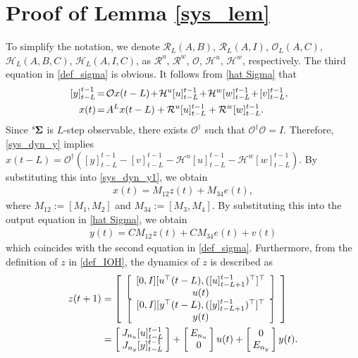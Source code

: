 \documentclass[preprint,5p,times,twocolumn]{elsarticle}
\newcommand{\bm}[1]{{\mbox{\boldmath $#1$}}}
\def\rms{{}^{\rm s}\hspace{-0.2mm}}
\def\h{\hspace{-0.5mm}}
\def\H{\hspace{-1.0mm}}
\def\HH{\hspace{-2.0mm}}
\begin{document}
\section{Proof of Lemma \ref{sys_lem}}\label{prf_sys_lem}
To simplify the notation, we denote 
$\mathcal R_L(A,B)$, 
$\mathcal R_L(A,I)$, 
$\mathcal O_L(A,C)$, 
$\mathcal H_L(A,B,C)$, 
$\mathcal H_L(A,I,C)$, as
$\mathcal R^u$, 
$\mathcal R^w$, 
$\mathcal O$,
$\mathcal H^u$, 
$\mathcal H^w$, respectively. The third equation in \eqref{def_sigma} is obvious. It follows from \eqref{hat Sigma} that
\begin{align}
\HH \H {[y]}_{t-L}^{t-1} & \h =\h \mathcal Ox(t-L) \h+\h \mathcal H^u[u]_{t-L}^{t-1}\h+\h \mathcal H^w[w]_{t-L}^{t-1} \h+\h [v]_{t-L}^{t-1},   \label{sys_dyn_y} \\
\HH \H x(t) & \h =\h A^Lx(t-L) + \mathcal R^u[u]_{t-L}^{t-1} + \mathcal R^w[w]_{t-L}^{t-1}.  \label{sys_dyn_y1}
\end{align}
Since $\rms {\bm \Sigma}$ is $L$-step observable, there exists $\mathcal O^{\dagger}$ such that $\mathcal O^{\dagger}\mathcal O = I$. Therefore, \eqref{sys_dyn_y} implies $x(t-L) = {\mathcal O}^{\dagger}\left({[y]}_{t-L}^{t-1} - [v]_{t-L}^{t-1} - \mathcal H^u[u]_{t-L}^{t-1} - \mathcal H^w[w]_{t-L}^{t-1}\right)$. By substituting this into \eqref{sys_dyn_y1}, we obtain  
\begin{align}
  x(t) = M_{12} z(t) + M_{34} e(t),  \label{x_IOH_rep}
\end{align}
where $M_{12} := [M_1, M_2]$ and $M_{34} := [M_3, M_4]$. By substituting this into the output equation in \eqref{hat Sigma}, we obtain 
\begin{align}\label{x_IOH}
y(t) = CM_{12} z(t) + CM_{34}e(t) + v(t)
\end{align}
which coincides with the second equation in \eqref{def_sigma}. Furthermore, from the definition of $z$ in \eqref{def_IOH}, the dynamics of $z$ is described as
\begin{align}
 z(t+1) &= \left[\begin{array}{c}
\left[\begin{array}{c}
[0, I][u^{\top}(t-L), ([u]^{t-1}_{t-L+1})^{\top}]^{\top} \\ u(t)
\end{array}
 \right] \\
\left[\begin{array}{c}
[0, I][y^{\top}(t-L), ([y]^{t-1}_{t-L+1})^{\top}]^{\top}  \\ y(t)
\end{array}
 \right]
\end{array}
 \right] \nonumber \\
 & = \left[\H \begin{array}{c}
J_{n_u}[u]^{t-1}_{t-L} \\
J_{n_y}[y]^{t-1}_{t-L} 
\end{array}
 \H\right] + \left[\H\begin{array}{c}
E_{n_u} \\ 0
\end{array}
 \H\right] u(t) + \left[\H\begin{array}{c}
 0 \\ E_{n_y}
\end{array}
 \H\right] y(t). \nonumber 
\end{align}
\end{document}
